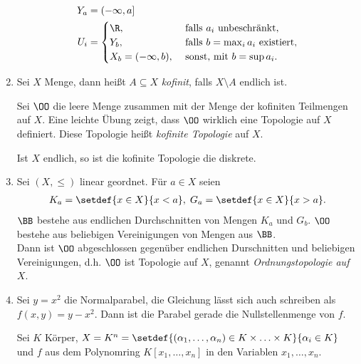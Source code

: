 \begin{bsp}
\begin{enumerate}[label=\arabic{*}.]
\begin{align*}
Y_a &= (-\infty,a]\\
U_i &= \begin{cases}
\R, & \text{ falls } a_i \text{ unbeschränkt},\\
Y_b, & \text{ falls } b = \max_i a_i \text{ existiert},\\
X_b = (-\infty,b), & \text{ sonst, mit } b = \sup a_i.
\end{cases}
\end{align*}
\item
\begin{defnn}
Sei $X$ Menge, dann heißt $A\subseteq X$ \emph{kofinit}, falls
$X\setminus A$ endlich ist.

Sei $\OO$ die leere Menge zusammen mit der Menge der kofiniten Teilmengen auf
$X$. Eine leichte Übung zeigt, dass $\OO$ wirklich eine Topologie auf $X$
definiert. Diese Topologie heißt \emph{kofinite Topologie} auf $X$.\fishhere
\end{defnn}
\begin{bemn}
Ist $X$ endlich, so ist die kofinite Topologie die diskrete.\maphere
\end{bemn}
\item
Sei $(X,\le)$ linear geordnet. Für $a\in X$ seien
\begin{align*}
K_a = \setdef{x\in X}{x< a},\;G_a = \setdef{x\in X}{x > a}.
\end{align*}
$\BB$ bestehe aus endlichen Durchschnitten von
Mengen $K_a$ und $G_b$. $\OO$ bestehe aus beliebigen Vereinigungen von Mengen
aus $\BB$.\\
Dann ist $\OO$ abgeschlossen gegenüber endlichen Durschnitten und beliebigen
Vereinigungen, d.h. $\OO$ ist Topologie auf $X$, genannt
\emph{Ordnungstopologie auf $X$}.
\item 
Sei $y = x^2$ die Normalparabel, die Gleichung lässt sich auch schreiben als
$f(x,y) = y-x^2$. Dann ist die Parabel gerade die Nullstellenmenge von $f$.

Sei $K$ Körper, $X = K^n = \setdef{(\alpha_1, \ldots, \alpha_n)\in K\times
\ldots\times K}{\alpha_i\in K}$ und $f$ aus dem Polynomring $K[x_1, \ldots,
x_n]$ in den Variablen $x_1, \ldots, x_n$.


\end{enumerate}
\end{bsp}
